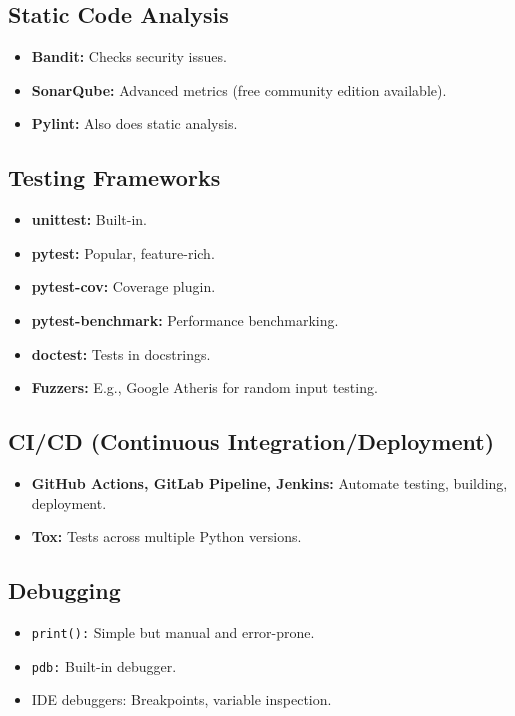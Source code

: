 \documentclass[11pt,a4paper]{article}
\begin{document}
\subsection*{Static Code Analysis}
\begin{itemize}
    \item \textbf{Bandit:} Checks security issues.
    \item \textbf{SonarQube:} Advanced metrics (free community edition available).
    \item \textbf{Pylint:} Also does static analysis.
\end{itemize}

\subsection*{Testing Frameworks}
\begin{itemize}
    \item \textbf{unittest:} Built-in.
    \item \textbf{pytest:} Popular, feature-rich.
    \item \textbf{pytest-cov:} Coverage plugin.
    \item \textbf{pytest-benchmark:} Performance benchmarking.
    \item \textbf{doctest:} Tests in docstrings.
    \item \textbf{Fuzzers:} E.g., Google Atheris for random input testing.
\end{itemize}

\subsection*{CI/CD (Continuous Integration/Deployment)}
\begin{itemize}
    \item \textbf{GitHub Actions, GitLab Pipeline, Jenkins:} Automate testing, building, deployment.
    \item \textbf{Tox:} Tests across multiple Python versions.
\end{itemize}

\subsection*{Debugging}
\begin{itemize}
    \item \texttt{print():} Simple but manual and error-prone.
    \item \texttt{pdb:} Built-in debugger.
    \item IDE debuggers: Breakpoints, variable inspection.
\end{itemize}
\end{document}
